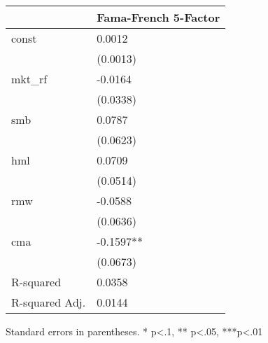\begin{table}
\caption{}
\label{}
\begin{center}
\begin{tabular}{ll}
\hline
               & Fama-French 5-Factor  \\
\hline
const          & 0.0012                \\
               & (0.0013)              \\
mkt\_rf        & -0.0164               \\
               & (0.0338)              \\
smb            & 0.0787                \\
               & (0.0623)              \\
hml            & 0.0709                \\
               & (0.0514)              \\
rmw            & -0.0588               \\
               & (0.0636)              \\
cma            & -0.1597**             \\
               & (0.0673)              \\
R-squared      & 0.0358                \\
R-squared Adj. & 0.0144                \\
\hline
\end{tabular}
\end{center}
\end{table}
\bigskip
Standard errors in parentheses. \newline 
* p<.1, ** p<.05, ***p<.01